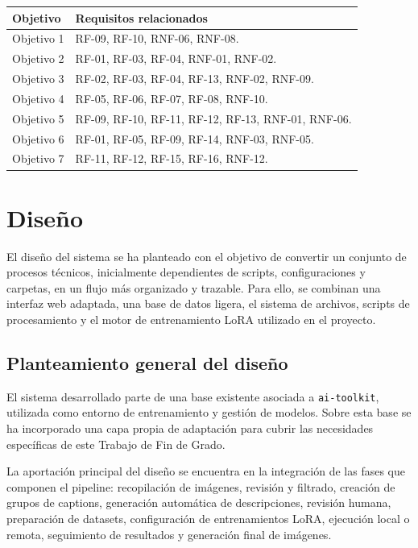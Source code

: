 \documentclass[a4paper,11pt,titlepage]{scrbook}
\newcommand{\estilotabla}{%
    \small
    \setlength{\tabcolsep}{4pt}
    \renewcommand{\arraystretch}{1.15}
}
\begin{document}
\begin{center}
\estilotabla
\begin{tabular}{|C{2.4cm}|L{9.8cm}|}
\hline
\textbf{Objetivo} & \textbf{Requisitos relacionados} \\
\hline
Objetivo 1 & RF-09, RF-10, RNF-06, RNF-08. \\
\hline
Objetivo 2 & RF-01, RF-03, RF-04, RNF-01, RNF-02. \\
\hline
Objetivo 3 & RF-02, RF-03, RF-04, RF-13, RNF-02, RNF-09. \\
\hline
Objetivo 4 & RF-05, RF-06, RF-07, RF-08, RNF-10. \\
\hline
Objetivo 5 & RF-09, RF-10, RF-11, RF-12, RF-13, RNF-01, RNF-06. \\
\hline
Objetivo 6 & RF-01, RF-05, RF-09, RF-14, RNF-03, RNF-05. \\
\hline
Objetivo 7 & RF-11, RF-12, RF-15, RF-16, RNF-12. \\
\hline
\end{tabular}
\label{tab:trazabilidad_requisitos}
\end{center}



\chapter{Diseño} \label{disenyo}

El diseño del sistema se ha planteado con el objetivo de convertir un conjunto de procesos técnicos, inicialmente dependientes de scripts, configuraciones y carpetas, en un flujo más organizado y trazable. Para ello, se combinan una interfaz web adaptada, una base de datos ligera, el sistema de archivos, scripts de procesamiento y el motor de entrenamiento LoRA utilizado en el proyecto.

\section{Planteamiento general del diseño}

El sistema desarrollado parte de una base existente asociada a \texttt{ai-toolkit}, utilizada como entorno de entrenamiento y gestión de modelos. Sobre esta base se ha incorporado una capa propia de adaptación para cubrir las necesidades específicas de este Trabajo de Fin de Grado.

\medskip

La aportación principal del diseño se encuentra en la integración de las fases que componen el pipeline: recopilación de imágenes, revisión y filtrado, creación de grupos de captions, generación automática de descripciones, revisión humana, preparación de datasets, configuración de entrenamientos LoRA, ejecución local o remota, seguimiento de resultados y generación final de imágenes.
\end{document}
